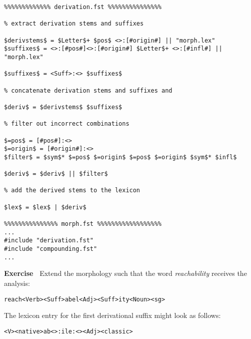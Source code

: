 \documentclass[11pt]{article}
\newenvironment{exercise}{

  \hrulefill\nopagebreak

  \textbf{Exercise~}}
{

  \nopagebreak\hrulefill\vspace{0.2cm}

}
\begin{document}
\begin{verbatim}
%%%%%%%%%%%%% derivation.fst %%%%%%%%%%%%%%%

% extract derivation stems and suffixes

$derivstems$ = $Letter$+ $pos$ <>:[#origin#] || "morph.lex"
$suffixes$ = <>:[#pos#]<>:[#origin#] $Letter$+ <>:[#infl#] || "morph.lex"

$suffixes$ = <Suff>:<> $suffixes$

% concatenate derivation stems and suffixes and

$deriv$ = $derivstems$ $suffixes$

% filter out incorrect combinations

$=pos$ = [#pos#]:<>
$=origin$ = [#origin#]:<>
$filter$ = $sym$* $=pos$ $=origin$ $=pos$ $=origin$ $sym$* $infl$

$deriv$ = $deriv$ || $filter$

% add the derived stems to the lexicon

$lex$ = $lex$ | $deriv$

%%%%%%%%%%%%%%% morph.fst %%%%%%%%%%%%%%%%%%
...
#include "derivation.fst"
#include "compounding.fst"
...
\end{verbatim}


\begin{exercise}
  Extend the morphology such that the word \emph{reachability}
  receives the analysis:
  
  \texttt{reach<Verb><Suff>abel<Adj><Suff>ity<Noun><sg>}
  
  The lexicon entry for the first derivational suffix might look as
  follows:

  \texttt{<V><native>ab<>:ile:<><Adj><classic>}
\end{exercise}
\end{document}
